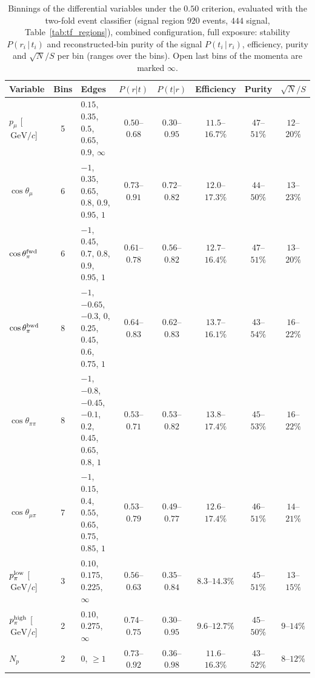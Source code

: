 \documentclass[11pt,a4paper]{article}
\newcommand{\GeVc}{\,\text{GeV}\!/c}
\begin{document}
\begin{table}[H]
  \centering
  \caption{Binnings of the differential variables under the $0.50$ criterion, evaluated with the two-fold event
    classifier (signal region $920$ events, $444$ signal, Table~\ref{tab:tf_regions}), combined configuration, full exposure: stability
    $P(r_i\,|\,t_i)$ and reconstructed-bin purity of the signal $P(t_i\,|\,r_i)$, efficiency, purity and $\sqrt{N}/S$ per
    bin (ranges over the bins). Open last bins of the momenta are marked $\infty$.}
  \label{tab:varbins}
  \scriptsize\setlength{\tabcolsep}{2.5pt}
  \begin{tabular}{lcL{4.1cm}ccccc}
    \toprule
    Variable & Bins & Edges & $P(r|t)$ & $P(t|r)$ & Efficiency & Purity & $\sqrt{N}/S$ \\
    \midrule
    $p_\mu$ [$\GeVc$] & 5 & $0.15$, $0.35$, $0.5$, $0.65$, $0.9$, $\infty$ & $0.50$--$0.68$ & $0.30$--$0.95$ & $11.5$--$16.7\%$ & $47$--$51\%$ & $12$--$20\%$ \\
    $\cos\theta_\mu$ & 6 & $-1$, $0.35$, $0.65$, $0.8$, $0.9$, $0.95$, $1$ & $0.73$--$0.91$ & $0.72$--$0.82$ & $12.0$--$17.3\%$ & $44$--$50\%$ & $13$--$23\%$ \\
    $\cos\theta_\pi^{\rm fwd}$ & 6 & $-1$, $0.45$, $0.7$, $0.8$, $0.9$, $0.95$, $1$ & $0.61$--$0.78$ & $0.56$--$0.82$ & $12.7$--$16.4\%$ & $47$--$51\%$ & $13$--$20\%$ \\
    $\cos\theta_\pi^{\rm bwd}$ & 8 & $-1$, $-0.65$, $-0.3$, $0$, $0.25$, $0.45$, $0.6$, $0.75$, $1$ & $0.64$--$0.83$ & $0.62$--$0.83$ & $13.7$--$16.1\%$ & $43$--$54\%$ & $16$--$22\%$ \\
    $\cos\theta_{\pi\pi}$ & 8 & $-1$, $-0.8$, $-0.45$, $-0.1$, $0.2$, $0.45$, $0.65$, $0.8$, $1$ & $0.53$--$0.71$ & $0.53$--$0.82$ & $13.8$--$17.4\%$ & $45$--$53\%$ & $16$--$22\%$ \\
    $\cos\theta_{\mu\pi}$ & 7 & $-1$, $0.15$, $0.4$, $0.55$, $0.65$, $0.75$, $0.85$, $1$ & $0.53$--$0.79$ & $0.49$--$0.77$ & $12.6$--$17.4\%$ & $46$--$51\%$ & $14$--$21\%$ \\
    $p_\pi^{\rm low}$ [$\GeVc$] & 3 & $0.10$, $0.175$, $0.225$, $\infty$ & $0.56$--$0.63$ & $0.35$--$0.84$ & $8.3$--$14.3\%$ & $45$--$51\%$ & $13$--$15\%$ \\
    $p_\pi^{\rm high}$ [$\GeVc$] & 2 & $0.10$, $0.275$, $\infty$ & $0.74$--$0.75$ & $0.30$--$0.95$ & $9.6$--$12.7\%$ & $45$--$50\%$ & $9$--$14\%$ \\
    $N_p$ & 2 & $0$, $\geq1$ & $0.73$--$0.92$ & $0.36$--$0.98$ & $11.6$--$16.3\%$ & $43$--$52\%$ & $8$--$12\%$ \\
    \bottomrule
  \end{tabular}
\end{table}
\end{document}
